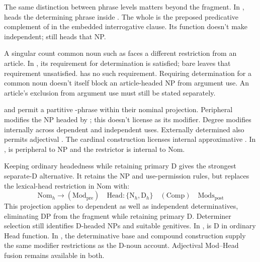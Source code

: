 \documentclass[12pt]{article}
\begin{document}
The same distinction between phrase levels matters beyond the fragment. In ,  heads the determining phrase inside . The whole  is the preposed predicative complement of  in the embedded interrogative clause. Its function doesn't make  independent;  still heads that NP.

A singular count common noun such as  faces a different restriction from an article. In , its requirement for determination is satisfied; bare  leaves that requirement unsatisfied.  has no such requirement. Requiring determination for a common noun doesn't itself block an article-headed NP from argument use. An article's exclusion from argument use must still be stated separately.

 and  permit a partitive -phrase within their nominal projection. Peripheral  modifies the NP headed by ; this doesn't license  as its modifier. Degree  modifies  internally across dependent and independent uses. Externally determined  also permits adjectival . The cardinal construction  licenses internal approximative . In ,  is peripheral to NP and the restrictor  is internal to Nom.

Keeping ordinary headedness while retaining primary D gives the strongest separate-D alternative. It retains the NP and use-permission rules, but replaces the lexical-head restriction in Nom with:
\[
\mathrm{Nom}_{h}\to(\mathrm{Mod}_{\mathrm{pre}})\quad\mathrm{Head}:\{\mathrm{N}_{h},\mathrm{D}_{h}\}\quad(\mathrm{Comp})\quad\mathrm{Mods}_{\mathrm{post}}
\]
This projection applies to dependent as well as independent determinatives, eliminating DP from the fragment while retaining primary D. Determiner selection still identifies D-headed NPs and suitable genitives. In ,  is D in ordinary Head function. In , the determinative base and compound construction supply the same modifier restrictions as the D-noun account. Adjectival Mod--Head fusion remains available in both.
\end{document}
